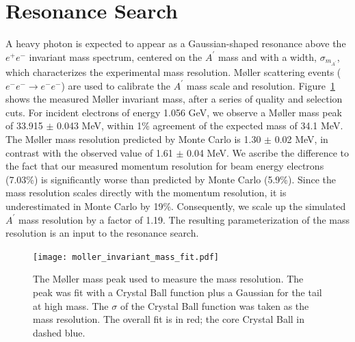 \documentclass[twocolumn, showpacs, preprintnumbers,prd, superscriptaddress]{revtex4-1}
\newcommand{\pos}{e^{+}}
\newcommand{\ele}{e^{-}}
\newcommand{\epem}{\pos\ele}
\newcommand{\emem}{\ele\ele}
\newcommand{\aprime}{A^\prime}
\begin{document}
    \section{Resonance Search}\label{sec:resonance}
       
        A heavy photon is expected to appear as a Gaussian-shaped resonance above the
        $\epem$ invariant mass spectrum, centered on the $\aprime$ mass and
        with a width, $\sigma_{m_{\aprime}}$, which characterizes the 
        experimental mass resolution.  M\o ller scattering events 
        ($\emem \rightarrow \emem$) are used to calibrate the $\aprime$ mass 
        scale and resolution.  Figure~\ref{fig:mass_resolution} shows the 
        measured M\o ller invariant mass, after a series of quality and 
        selection cuts.  For incident electrons of energy 1.056 GeV, we observe
        a M\o ller mass peak of 33.915 $\pm$ 0.043 MeV, within 1\% agreement of
        the expected mass of 34.1 MeV.  The M\o ller mass resolution predicted
        by Monte Carlo is 1.30 $\pm$ 0.02 MeV, in contrast with the observed 
        value of 1.61 $\pm$ 0.04 MeV.  We ascribe the difference to the fact 
        that our measured momentum resolution for beam energy electrons (7.03\%) 
        is significantly worse than predicted by Monte Carlo (5.9\%). Since
        the mass resolution scales directly with the momentum resolution, it 
        is underestimated in Monte Carlo by 19\%.  Consequently, we scale up
        the simulated $\aprime$ mass resolution by a factor of 1.19.
        The resulting parameterization of the mass resolution is an input to the 
        resonance search.
        
        \begin{figure}[th]
            \centering
            \texttt{[image: moller\_invariant\_mass\_fit.pdf]}
            \caption{
                The M\o ller mass peak used to measure the mass resolution.
                The peak was fit with a Crystal Ball function plus a Gaussian
                for the tail at high mass. The $\sigma$ of the Crystal Ball 
                function was taken as the mass resolution. The overall fit is 
                in red; the core Crystal Ball in dashed blue.}
            \label{fig:mass_resolution}
        \end{figure}
\end{document}
